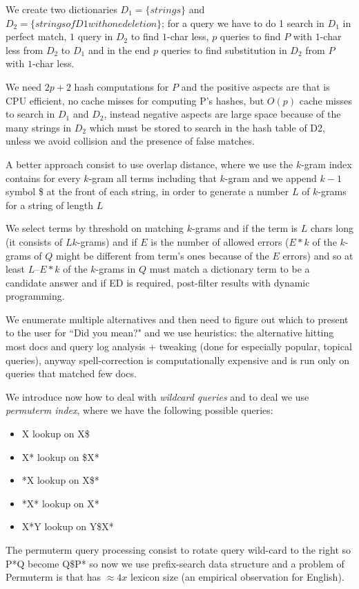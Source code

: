 We create two dictionaries $D_1 = \{ strings \}$ and $D_2 = \{ strings of D1 with one deletion \}$; for a query we have to 
do 1 search in $D_1$ in perfect match, $1$ query in $D_2$ to find $1$-char less, $p$ queries to find $P$ with $1$-char less from $D_2$ to $D_1$
and in the end $p$ queries to find substitution in $D_2$ from $P$ with $1$-char less.

We need $2p + 2$ hash computations for $P$ and the positive aspects are that is CPU efficient, no cache misses for computing P’s hashes,
but $O(p)$ cache misses to search in $D_1$ and $D_2$, instead negative aspects are large space because of the many strings in $D_2$ 
which must be stored to search in the hash table of D2, unless we avoid collision and the presence of false matches.

A better approach consist to use overlap distance, where we use the $k$-gram index contains for every $k$-gram all terms including
that $k$-gram and we append $k-1$ symbol \$ at the front of each string, in order to generate a number $L$ of $k$-grams 
for a string of length $L$

We select terms by threshold on matching $k$-grams and if the term is $L$ chars long (it consists of $L k$-grams) and if $E$
is the number of allowed errors ($E*k$ of the $k$-grams of $Q$ might be different from term’s ones because of the $E$ errors) and 
so at least $L – E*k$ of the $k$-grams in $Q$ must match a dictionary term to be a candidate answer and if ED is required,
post-filter results with dynamic programming.

We enumerate multiple alternatives and then need to figure out which to present to the user for “Did you mean?" and we use heuristics:
the alternative hitting most docs and query log analysis + tweaking (done for especially popular, topical queries), anyway
spell-correction is computationally expensive and is run only on queries that matched few docs.

We introduce now how to deal with \emph{wildcard queries} and to deal we use \emph{permuterm index}, where we have the 
following possible queries:
\begin{itemize}
    \item X lookup on X\$
    \item X* lookup on   \$X*
    \item *X lookup on X\$*
    \item *X* lookup on X*
    \item X*Y lookup on Y\$X*
\end{itemize}
The permuterm query processing consist to rotate query wild-card to the right so P*Q become Q\$P* so now we 
use prefix-search data structure and a problem of Permuterm is that has $\approx 4x$ lexicon size (an empirical observation for English).

